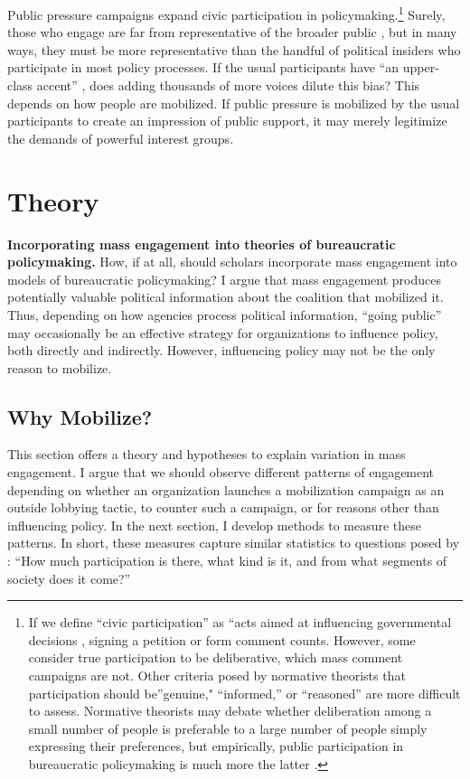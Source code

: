 \documentclass[
      12pt,
        ]{article}
\begin{document}
Public pressure campaigns expand civic participation in policymaking.\footnote{If we define ``civic participation'' as ``acts aimed at influencing governmental decisions \citep[ p.~2]{Verba1987}, signing a petition or form comment counts. However, some consider true
  participation to be deliberative, which mass comment campaigns are not.
  Other criteria posed by normative theorists that participation should be''genuine," ``informed,'' or ``reasoned'' are more difficult to assess. Normative theorists may debate whether deliberation among a small number of people is preferable to a large number of people simply expressing their preferences, but empirically, public participation in bureaucratic policymaking is much more the latter \citep{Shapiro2008b}.}
Surely, those who engage are far from representative of the broader public \citep{Verba1987}, but in many ways, they must be more representative than the handful of political insiders who participate in most policy processes. If the usual participants have ``an upper-class accent'' \citep{Schattschneider1942}, does adding thousands of more voices dilute this bias? This depends on how people are mobilized. If public pressure is mobilized by the usual participants to create an impression of public support, it may merely legitimize the demands of powerful interest groups.

\hypertarget{theory}{%
\section{Theory}\label{theory}}

\textbf{Incorporating mass engagement into theories of bureaucratic policymaking.}
How, if at all, should scholars incorporate mass engagement into models of bureaucratic policymaking?
I argue that mass engagement produces potentially valuable political information about the coalition that mobilized it.
Thus, depending on how agencies process political information, ``going public'' may occasionally be an effective strategy for organizations to influence policy, both directly and indirectly. However, influencing policy may not be the only reason to mobilize.

\hypertarget{why-mobilize}{%
\subsection{Why Mobilize?}\label{why-mobilize}}

This section offers a theory and hypotheses to explain variation in mass
engagement. I argue that we should observe different patterns of
engagement depending on whether an organization launches a mobilization
campaign as an outside lobbying tactic, to counter such a campaign, or
for reasons other than influencing policy. In the next section, I
develop methods to measure these patterns. In short, these measures
capture similar statistics to questions posed by \citet[p.~9]{Verba1987}: ``How
much participation is there, what kind is it, and from what segments of
society does it come?''
\end{document}
